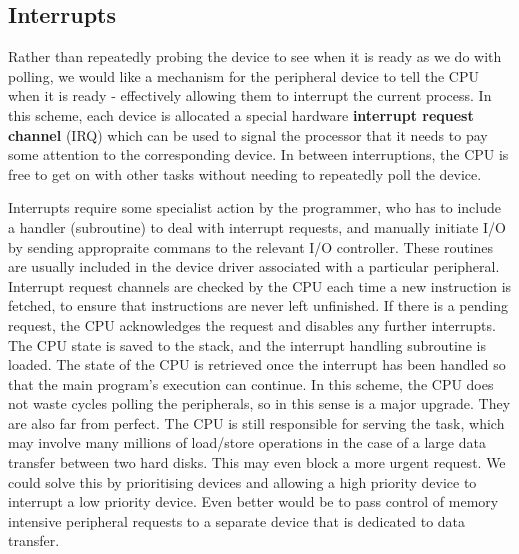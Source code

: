 \documentclass{article}
\begin{document}
	\subsection{Interrupts}
	Rather than repeatedly probing the device to see when it is ready as we do with polling, we would like a mechanism for the peripheral device to tell the CPU when it is ready - effectively allowing them to interrupt the current process. In this scheme, each device is allocated a special hardware \textbf{interrupt request channel} (IRQ) which can be used to signal the processor that it needs to pay some attention to the corresponding device. In between interruptions, the CPU is free to get on with other tasks without needing to repeatedly poll the device.
	
	\par 
	Interrupts require some specialist action by the programmer, who has to include a handler (subroutine) to deal with interrupt requests, and manually initiate I/O by sending appropraite commans to the relevant I/O controller. These routines are usually included in the device driver associated with a particular peripheral. Interrupt request channels are checked by the CPU each time a new instruction is fetched, to ensure that instructions are never left unfinished. If there is a pending request, the CPU acknowledges the request and disables any further interrupts. The CPU state is saved to the stack, and the interrupt handling subroutine is loaded. The state of the CPU is retrieved  once the interrupt has been handled so that the main program's execution can continue. In this scheme, the CPU does not waste cycles polling the peripherals, so in this sense is a major upgrade. They are also far from perfect. The CPU is still responsible for serving the task, which may involve many millions of load/store operations in the case of a large data transfer between two hard disks. This may even block a more urgent request. We could solve this by prioritising devices and allowing a high priority device to interrupt a low priority device. Even better would be to pass control of memory intensive peripheral requests to a separate device that is dedicated to data transfer.
	
\end{document}
